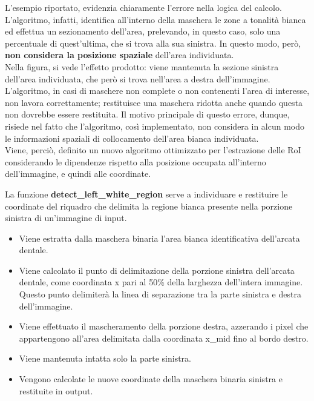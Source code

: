 \documentclass[12pt,a4paper,openright,twoside]{book}
\begin{document}
L'esempio riportato, evidenzia chiaramente l'errore nella logica del calcolo. L'algoritmo, infatti, identifica all'interno della maschera le zone a tonalità bianca ed effettua un sezionamento dell'area, prelevando, in questo caso, solo una percentuale di quest'ultima, che si trova alla sua sinistra. In questo modo, però, \textbf{non considera la posizione spaziale} dell'area individuata. \\
Nella figura, si vede l'effetto prodotto: viene mantenuta la sezione sinistra dell'area individuata, che però si trova nell'area a destra dell'immagine.\\
L'algoritmo, in casi di maschere non complete o non contenenti l'area di interesse, non lavora correttamente; restituisce una maschera ridotta anche quando questa non dovrebbe essere restituita. Il motivo principale di questo errore, dunque, risiede nel fatto che l'algoritmo, così implementato, non considera in alcun modo le informazioni spaziali di collocamento dell'area bianca individuata.\\

Viene, perciò, definito un nuovo algoritmo ottimizzato per l'estrazione delle RoI considerando le dipendenze rispetto alla posizione occupata all'interno dell'immagine, e quindi alle coordinate.

\begin{figure}[H]
    \centering
    
\end{figure}

La funzione \textbf{detect\_left\_white\_region} serve a individuare e restituire le coordinate del riquadro che delimita la regione bianca presente nella porzione sinistra di un'immagine di input.
\begin{itemize}
\item Viene estratta dalla maschera binaria l'area bianca identificativa dell'arcata dentale.
\item Viene calcolato il punto di delimitazione della porzione sinistra dell'arcata dentale, come coordinata x pari al 50\% della larghezza dell'intera immagine. Questo punto delimiterà la linea di separazione tra la parte sinistra e destra dell'immagine.
\item Viene effettuato il mascheramento della porzione destra, azzerando i pixel che appartengono all'area delimitata dalla coordinata x\_mid fino al bordo destro.
\item Viene mantenuta intatta solo la parte sinistra.
\item Vengono calcolate le nuove coordinate della maschera binaria sinistra e restituite in output.
\end{itemize}
\end{document}
